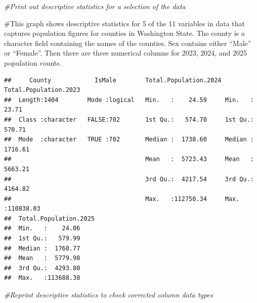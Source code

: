 \documentclass[
]{article}
\newenvironment{Shaded}{\begin{snugshade}}{\end{snugshade}}
\newcommand{\CommentTok}[1]{\textcolor[rgb]{0.56,0.35,0.01}{\textit{#1}}}
\newcommand{\FunctionTok}[1]{\textcolor[rgb]{0.13,0.29,0.53}{\textbf{#1}}}
\newcommand{\NormalTok}[1]{#1}
\newcommand{\OtherTok}[1]{\textcolor[rgb]{0.56,0.35,0.01}{#1}}
\newcommand{\SpecialCharTok}[1]{\textcolor[rgb]{0.81,0.36,0.00}{\textbf{#1}}}
\newcommand{\StringTok}[1]{\textcolor[rgb]{0.31,0.60,0.02}{#1}}
\begin{document}
\begin{Shaded}
\begin{Highlighting}[]
\CommentTok{\#Print out descriptive statistics for a selection of the data}
\end{Highlighting}
\end{Shaded}

\#This graph shows descriptive statistics for 5 of the 11 variables in
data that captures population figures for counties in Washington State.
The county is a character field containing the names of the counties.
Sex contains either ``Male'' or ``Female''. Then there are three
numerical columns for 2023, 2024, and 2025 population counts.

\begin{Shaded}
\end{Shaded}

\begin{verbatim}
##     County            IsMale        Total.Population.2024 Total.Population.2023
##  Length:1404        Mode :logical   Min.   :    24.59     Min.   :    23.71    
##  Class :character   FALSE:702       1st Qu.:   574.70     1st Qu.:   570.71    
##  Mode  :character   TRUE :702       Median :  1738.60     Median :  1716.61    
##                                     Mean   :  5723.43     Mean   :  5663.21    
##                                     3rd Qu.:  4217.54     3rd Qu.:  4164.82    
##                                     Max.   :112750.34     Max.   :110838.03    
##  Total.Population.2025
##  Min.   :    24.06    
##  1st Qu.:   579.99    
##  Median :  1760.77    
##  Mean   :  5779.98    
##  3rd Qu.:  4293.80    
##  Max.   :113688.38
\end{verbatim}

\begin{Shaded}
\begin{Highlighting}[]
\CommentTok{\#Reprint descriptive statistics to check corrected column data types}
\end{Highlighting}
\end{Shaded}
\end{document}
